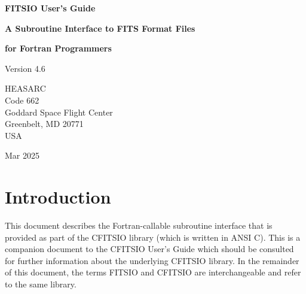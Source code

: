 \documentclass[11pt]{book}
\begin{document}

\begin{titlepage}
\normalsize
\vspace*{4.6cm}
\begin{center}
{\Huge \bf FITSIO User's Guide}\\
\end{center}
\medskip
\medskip
\begin{center}
{\LARGE \bf A Subroutine Interface to FITS Format Files}\\
\end{center}
\begin{center}
{\LARGE \bf for Fortran Programmers}\\
\end{center}
\medskip
\medskip
\begin{center}
{\Large Version 4.6\\}
\end{center}
\bigskip
\vskip 2.5cm
\begin{center}
{HEASARC\\
Code 662\\
Goddard Space Flight Center\\
Greenbelt, MD 20771\\
USA}
\end{center}

\vfill
\bigskip
\begin{center}
{\Large Mar 2025\\}
\end{center}
\vfill
\end{titlepage}

\clearpage

\tableofcontents

\chapter{Introduction }

This document describes the Fortran-callable subroutine interface that
is provided as part of the CFITSIO library (which is written in ANSI
C).  This is a companion document to the CFITSIO User's Guide which
should be consulted for further information about the underlying
CFITSIO library.  In the remainder of this document, the terms FITSIO
and CFITSIO are interchangeable and refer to the same library.
\end{document}
